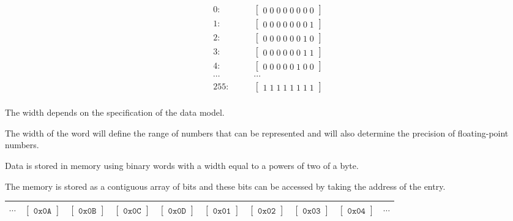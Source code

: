 \documentclass{article}
\begin{document}
\begin{eqnarray*}
0 :&\qquad\begin{bmatrix}0\;0\;0\;0\;0\;0\;0\;0 \end{bmatrix}\\
1 :&\qquad\begin{bmatrix}0\;0\;0\;0\;0\;0\;0\;1 \end{bmatrix}\\
2 :&\qquad\begin{bmatrix}0\;0\;0\;0\;0\;0\;1\;0 \end{bmatrix}\\
3 :&\qquad\begin{bmatrix}0\;0\;0\;0\;0\;0\;1\;1 \end{bmatrix}\\
4 :&\qquad\begin{bmatrix}0\;0\;0\;0\;0\;1\;0\;0 \end{bmatrix}\\
\cdots&\qquad\cdots\\
255:&\qquad\begin{bmatrix}1\;1\;1\;1\;1\;1\;1\;1 \end{bmatrix}\\
\end{eqnarray*}

The width depends on the specification of the data model.

The width of the word will define the range of numbers that can be represented and will also determine the precision of floating-point numbers.

Data is stored in memory using binary words with a width equal to a  powers of two of a byte.

The memory is stored as a contiguous array of bits and these bits can be accessed by taking the address of the entry.

\bigskip
\begin{tabular}{c|cccc|cccc|c}
\hline
$\cdots$ & $\begin{bmatrix}\texttt{0x0A}\end{bmatrix}$ 
         & $\begin{bmatrix}\texttt{0x0B}\end{bmatrix}$ 
         & $\begin{bmatrix}\texttt{0x0C}\end{bmatrix}$ 
         & $\begin{bmatrix}\texttt{0x0D}\end{bmatrix}$
         & $\begin{bmatrix}\texttt{0x01}\end{bmatrix}$
         & $\begin{bmatrix}\texttt{0x02}\end{bmatrix}$ 
         & $\begin{bmatrix}\texttt{0x03}\end{bmatrix}$ 
         & $\begin{bmatrix}\texttt{0x04}\end{bmatrix}$ & $\cdots$ \\
\hline
\end{tabular}
\end{document}
